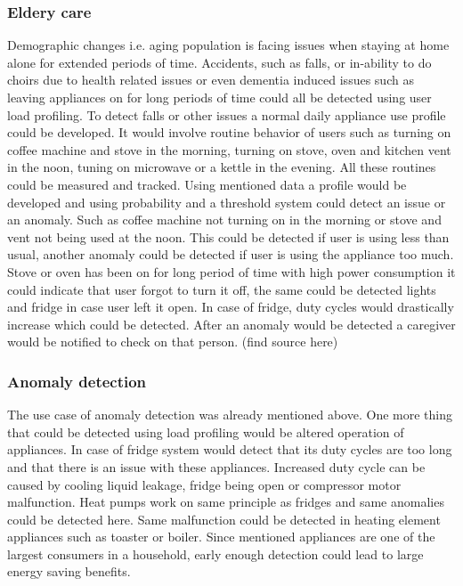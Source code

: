 \documentclass[
11pt, %
english, %
singlespacing, %
headsepline, %
]{MastersDoctoralThesis} %
\begin{document}
\subsubsection{Eldery care}

Demographic changes i.e. aging population is facing issues when staying at home alone for extended periods of time.
Accidents, such as falls, or in-ability to do choirs due to health related issues or even dementia induced issues 
such as leaving appliances on for long periods of time could all be detected using user load profiling. To detect falls 
or other issues a normal daily appliance use profile could be developed. It would involve routine behavior of users
such as turning on coffee machine and stove in the morning, turning on stove, oven and kitchen vent in the noon, tuning on microwave or a kettle in the evening.
All these routines could be measured and tracked. Using mentioned data a profile would be developed and using probability and a threshold system could detect an issue
or an anomaly. Such as coffee machine not turning on in the morning or stove and vent not being used at the noon. This could be detected if user is using less than usual,
another anomaly could be detected if user is using the appliance too much. Stove or oven has been on for long period of time with high power consumption it could
indicate that user forgot to turn it off, the same could be detected lights and fridge in case user left it open. In case of fridge, duty cycles would drastically 
increase which could be detected. After an anomaly would be detected a caregiver would be notified to check on that person. (find source here)

\subsubsection{Anomaly detection}

The use case of anomaly detection was already mentioned above. One more thing that could be detected using load profiling
would be altered operation of appliances. In case of fridge system would detect that its duty cycles are too long
and that there is an issue with these appliances. Increased duty cycle can be caused by cooling liquid leakage, fridge being open or compressor motor 
malfunction. Heat pumps work on same principle as fridges and same anomalies could be detected here. 
Same malfunction could be detected in heating element appliances such as toaster or boiler. 
Since mentioned appliances are one of the largest consumers in a household,
early enough detection could lead to large energy saving benefits. 
\end{document}
